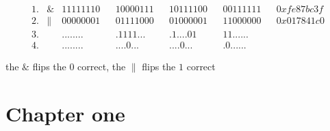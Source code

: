 \begin{align*}    
    1.& \& & 11111110& &10000111& &10111100& &00111111& &0xfe87bc3f \\
    2.& \| & 00000001& &01111000& &01000001& &11000000& &0x017841c0 \\
    3.&    & ........& &.1111...& &.1....01& &11......& & \\
    4.&    & ........& &....0...& &....0...& &.0......& & 
\end{align*}

  the $\&$ flips the $0$ correct, the $\|$ flips the $1$ correct



\section{Chapter one}